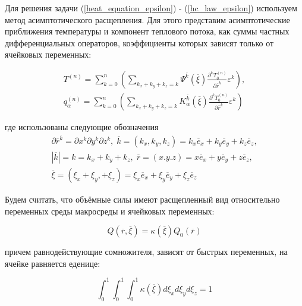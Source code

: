 Для решения задачи 
(\ref{heat_equation_epsilon})
-
(\ref{hc_law_epsilon})
используем метод асимптотического расщепления. Для этого представим асимптотические приближения температуры и компонент теплового потока,
как суммы частных дифференциальных операторов, коэффициенты которых зависят только от ячейковых переменных:

\begin{equation}
    \label{asimp_T_q}
    \begin{aligned}
        T^{(n)} = 
        \sum^n_{k=0} \left( \sum_{k_x+k_y+k_z=k} \Psi^{\overline{k}}(\overline{\xi})  
        \frac{\partial^kT^{(n)}_0}{\partial \overline{r}^{\overline{k}}}\varepsilon^k \right) ,
        \\
        q^{(n)}_{\alpha} = 
        \sum^n_{k=0} \left( \sum_{k_x+k_y+k_z=k} K^{\overline{k}}_{\alpha}(\overline{\xi})  
        \frac{\partial^kT^{(n)}_0}{\partial \overline{r}^{\overline{k}}}\varepsilon^k \right)
    \end{aligned}
\end{equation}

где использованы следующие обозначения
\begin{equation}
    \begin{gathered}
        \partial \overline{r}^{\overline{k}} = \partial x^k \partial y^k \partial z^k, \;
        \overline{k} = (k_x,k_y,k_z) = k_x \overline{e}_x+k_y \overline{e}_y+k_z \overline{e}_z,
        \\
        |\overline{k}| = k = k_x+k_y+k_z, \; \overline{r} = (x.y.z) = x \overline{e}_x + y \overline{e}_y + z \overline{e}_z,
        \\
        \overline{\xi} = \left( \xi_x + \xi_y, + \xi_z \right) = \xi_x \overline{e}_x + \xi_y \overline{e}_y + \xi_z \overline{e}_z
    \end{gathered}
\end{equation}


Будем считать, что объёмные силы имеют расщепленный вид относительно переменных среды макросреды и ячейковых переменных:

\begin{equation}
    \label{volum_force}
    Q \left( \overline{r}, \overline{\xi} \right) = \kappa \left( \overline{\xi} \right) Q_0 \left( \overline{r} \right)
\end{equation}

причем равнодействующие сомножителя, зависят от быстрых переменных, на ячейке равняется еденице:

\begin{equation}
    \label{integ_vf}
    \int_0^1 \int_0^1 \int_0^1 \kappa \left( \overline{\xi} \right) d\xi_x d\xi_y d\xi_z = 1
\end{equation}


